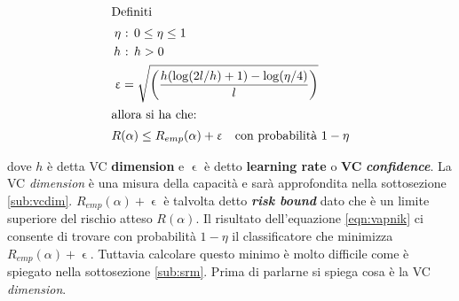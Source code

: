 \begin{align}
  \intertext{Definiti} 
  \eta &\text{ : } 0 \leq \eta \leq 1 \notag \\ 
  h &\text{ : } h > 0 \\
  \upvarepsilon &= \sqrt{\biggl(\frac{h(\log (2l/h) + 1) - \log (\eta/4)}{l}\biggl)}\\ \intertext{allora si ha che:} 
  R&(\alpha) \leq R_{emp}(\alpha) +\upvarepsilon \quad \text{con probabilità }1-\eta \label{eqn:vapnik}
\end{align}

dove $h$ è detta \ac{VC} \textbf{dimension} e $\upvarepsilon$ è detto \textbf{learning rate} o \textbf{\ac{VC}} \textbf{\textit{confidence}}. La \ac{VC} \textit{dimension} è una misura della capacità e sarà approfondita nella sottosezione \ref{sub:vcdim}.  $R_{emp}(\alpha) +\upvarepsilon$ è talvolta detto \textbf{\textit{risk bound}} dato che è un limite superiore del rischio atteso $R(\alpha)$.  Il risultato dell'equazione \eqref{eqn:vapnik} ci consente di trovare con probabilità $1-\eta$ il classificatore che minimizza $R_{emp}(\alpha) +\upvarepsilon$. Tuttavia calcolare questo minimo è molto difficile come è spiegato nella sottosezione \ref{sub:srm}. Prima di parlarne si spiega cosa è la \ac{VC} \textit{dimension}.

